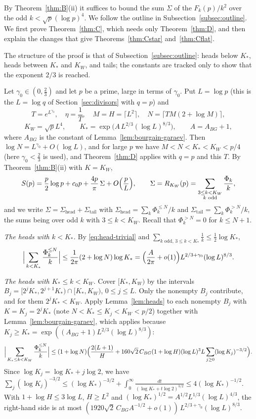By Theorem~\ref{thm:B}(ii) it suffices to bound the sum $\Sigma$ of the $F_k(p)/k^2$ over the odd $k<\sqrt p(\log p)^4$. We follow the outline in Subsection~\ref{subsec:outline}. We first prove Theorem~\ref{thm:C}, which needs only Theorem~\ref{thm:D}, and then explain the changes that give Theorems~\ref{thm:Cstar} and~\ref{thm:Cflat}.

The structure of the proof is that of Subsection~\ref{subsec:outline}: heads below $K_*$, heads between $K_*$ and $K_W$, and tails; the constants are tracked only to show that the exponent $2/3$ is reached.

Let $\gamma_0\in(0,\frac23)$ and let $p$ be a prime, large in terms of $\gamma_0$. Put $L=\log p$ (this is the $L=\log q$ of Section~\ref{sec:divisors} with $q=p$) and
\[
T=e^{L^{\gamma_0}},\quad\eta=\frac1T,\quad M=H=\lceil L^2\rceil,\quad N=\bigl\lceil TM(2+\log M)\bigr\rceil,
\]
\[
K_W=\sqrt pL^4,\qquad K_*=\exp\bigl(A\,L^{2/3}(\log L)^{8/3}\bigr),\qquad A=A_{BG}+1,
\]
where $A_{BG}$ is the constant of Lemma~\ref{lem:bourgain-garaev}.
Then $\log N=L^{\gamma_0}+O(\log L)$, and for large $p$ we have $M<N<K_*<K_W<p/4$ (here $\gamma_0<\frac23$ is used),
and Theorem~\ref{thm:D} applies with $q=p$ and this $T$. By Theorem~\ref{thm:B}(ii) with $K=K_W$,
\begin{equation}\label{eq:S-Sigma}
S(p)=\frac p2\log p+c_0p+\frac{4p}\pi\,\Sigma+O\Bigl(\frac pL\Bigr),\qquad
\Sigma=R_{K_W}(p)=\sum_{\substack{3\le k<K_W\\ k\text{ odd}}}\frac{\Phi_k}k,
\end{equation}
and we write $\Sigma=\Sigma_{\mathrm{head}}+\Sigma_{\mathrm{tail}}$ with $\Sigma_{\mathrm{head}}=\sum_k\Phi_k^{\le N}/k$
and $\Sigma_{\mathrm{tail}}=\sum_k\Phi_k^{>N}/k$, the sums being over odd $k$ with $3\le k<K_W$. Recall that
$\Phi_k^{>N}=0$ for $k\le N+1$.

\emph{The heads with $k<K_*$.} By \eqref{eq:head-trivial} and
$\sum_{k\text{ odd},\,3\le k<K_*}\frac1k\le\frac12\log K_*$,
\[
\Big|\sum_{k<K_*}\frac{\Phi_k^{\le N}}k\Big|\le\frac1{2\pi}(2+\log N)\log K_*=\Bigl(\frac A{2\pi}+o(1)\Bigr)
L^{2/3+\gamma_0}(\log L)^{8/3}.
\]

\emph{The heads with $K_*\le k<K_W$.} Cover $[K_*,K_W)$ by the intervals $B_j=[2^jK_*,2^{j+1}K_*)\cap[K_*,K_W)$,
$0\le j\le L$. Only the nonempty $B_j$ contribute, and for them $2^jK_*<K_W$. Apply Lemma~\ref{lem:heads} to each
nonempty $B_j$ with $K=K_j=2^jK_*$ (note $N<K_*\le K_j<K_W<p/2$) together with Lemma~\ref{lem:bourgain-garaev}, which
applies because $K_j\ge K_*=\exp((A_{BG}+1)L^{2/3}(\log L)^{8/3})$:
\[
\Big|\sum_{K_*\le k<K_W}\frac{\Phi_k^{\le N}}k\Big|\le(1+\log N)\Bigl(\frac{2(L+1)}H+160\sqrt2\,C_{BG}(1+\log H)
(\log L)^3L\sum_{j\ge0}(\log K_j)^{-3/2}\Bigr).
\]
Since $\log K_j=\log K_*+j\log2$, we have $\sum_j(\log K_j)^{-3/2}\le(\log K_*)^{-3/2}+\int_0^\infty\frac{dt}{(\log
K_*+t\log2)^{3/2}}\le4(\log K_*)^{-1/2}$. With $1+\log H\le3\log L$, $H\ge L^2$ and
$(\log K_*)^{1/2}=A^{1/2}L^{1/3}(\log L)^{4/3}$, the right-hand side is at most
$(1920\sqrt2\,C_{BG}A^{-1/2}+o(1))\,L^{2/3+\gamma_0}(\log L)^{8/3}$.

